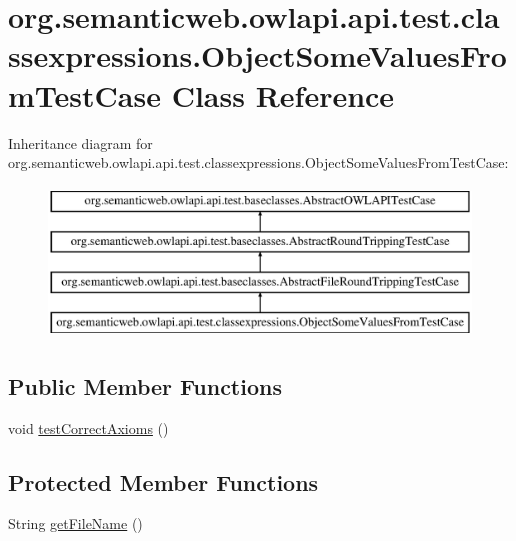 \hypertarget{classorg_1_1semanticweb_1_1owlapi_1_1api_1_1test_1_1classexpressions_1_1_object_some_values_from_test_case}{\section{org.\-semanticweb.\-owlapi.\-api.\-test.\-classexpressions.\-Object\-Some\-Values\-From\-Test\-Case Class Reference}
\label{classorg_1_1semanticweb_1_1owlapi_1_1api_1_1test_1_1classexpressions_1_1_object_some_values_from_test_case}
}
Inheritance diagram for org.\-semanticweb.\-owlapi.\-api.\-test.\-classexpressions.\-Object\-Some\-Values\-From\-Test\-Case\-:\begin{figure}[H]
\begin{center}
\leavevmode
\includegraphics[height=4.000000cm]{classorg_1_1semanticweb_1_1owlapi_1_1api_1_1test_1_1classexpressions_1_1_object_some_values_from_test_case}
\end{center}
\end{figure}
\subsection*{Public Member Functions}
\begin{DoxyCompactItemize}
\item 
void \hyperlink{classorg_1_1semanticweb_1_1owlapi_1_1api_1_1test_1_1classexpressions_1_1_object_some_values_from_test_case_ab1de4f90efe76475f5b43a966dde152a}{test\-Correct\-Axioms} ()
\end{DoxyCompactItemize}
\subsection*{Protected Member Functions}
\begin{DoxyCompactItemize}
\item 
String \hyperlink{classorg_1_1semanticweb_1_1owlapi_1_1api_1_1test_1_1classexpressions_1_1_object_some_values_from_test_case_a032aa1c1088b3b30c6c3bd63c0c8ddea}{get\-File\-Name} ()
\end{DoxyCompactItemize}


